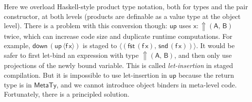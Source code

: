 \documentclass[acmsmall,screen,review,anonymous]{acmart}
\newcommand{\mit}[1]{{\mathsf{#1}}}
\newcommand{\msf}[1]{{\mathsf{#1}}}
\newcommand{\mbf}[1]{{\mathbf{#1}}}
\newcommand{\bs}[1]{\boldsymbol{#1}}
\newcommand{\ind}{\hspace{1em}}
\newcommand{\where}{\mbf{where}}
\newcommand{\vA}{\mathsf{A}}
\newcommand{\vB}{\mathsf{B}}
\newcommand{\vx}{\mathsf{x}}
\newcommand{\vf}{\mathsf{f}}
\newcommand{\Up}{{\Uparrow}}
\newcommand{\spl}{{\bs{\sim}}}
\newcommand{\ql}{{\bs{\langle}}}
\newcommand{\qr}{{\bs{\rangle}}}
\newcommand{\MTy}{\msf{MetaTy}}
\newcommand{\Ty}{\msf{Ty}}
\newcommand{\fst}{\msf{fst}}
\newcommand{\snd}{\msf{snd}}
\theoremstyle{remark}
\newcommand{\mup}{\mit{up}}
\newcommand{\mdown}{\mit{down}}
\newcommand{\tyclass}{\mbf{class}}
\newcommand{\instance}{\mbf{instance}\,}
\newcommand{\Improve}{\msf{Improve}}
\begin{document}

Here we overload Haskell-style product type notation, both for types and the
pair constructor, at both levels (products are definable as a value type at the
object level). There is a problem with this conversion though: $\mup$ uses $\vx
: \Up(\vA,\,\vB)$ twice, which can increase code size and duplicate runtime
computations. For example, $\mdown\,({\mup\,\ql \vf\,\vx \qr})$ is staged to
$\ql (\fst\,(\vf\,\vx),\,\snd\,(\vf\,\vx)) \qr$. It would be safer to first
let-bind an expression with type $\Up(\vA,\,\vB)$, and then only use projections
of the newly bound variable. This is called \emph{let-insertion} in staged
compilation. But it is impossible to use let-insertion in $\mup$ because the
return type is in $\MTy$, and we cannot introduce object binders in meta-level
code.  Fortunately, there is a principled solution.
\end{document}

